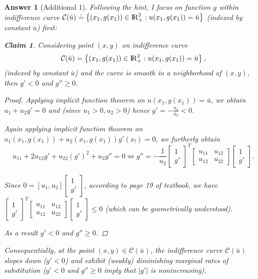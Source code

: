 \documentclass{article}
\newtheorem*{ans}{Answer}
\newtheorem{claim}{Claim}
\newcommand {\Reals}  {{\rm I \! R}}
\newcommand{\1}{{\bf 1}}
\newcommand{\cC}{\mathcal{C}}
\newcommand{\0}{{\mathbf{0}}}
\newcommand{\<}{\langle}
\renewcommand{\>}{\rangle}
\begin{document}
\begin{ans}[Additional 1]
	Following the hint, I focus on function $g$ within indifference curve $\cC(\bar u) \doteq \left\{(x_1, g(x_1)) \in \Reals_+^2: u(x_1, g(x_1)) = \bar u\right\}$ (indexed by constant $\bar u$) first:
\begin{mdframed}
		\begin{claim}
		Considering point $(x,y)$ on indifference curve 
		$$\cC(\bar u) = \left\{(x_1, g(x_1)) \in \Reals_+^2: u(x_1, g(x_1)) = \bar u\right\},$$ (indexed by constant $\bar u$) and the curve is smooth in a neighborhood of $(x,y)$, then
		$g'<0$ and $g''\ge 0$.
	\end{claim} 
\end{mdframed}
\begin{proof}
	Applying implicit function theorem on $u(x_1, g(x_1)) = \bar u$, we obtain $u_1 +u_2 g' = 0$ and (since $u_1>0,u_2 >0$) hence $g' =  - \frac{u_1}{u_2} <0$.
	
	Again applying implicit function theorem on $u_1 (x_1, g(x_1)) +u_2 (x_1, g(x_1))g'(x_!) = 0$, we furtherly obtain
	$$ u_{11} + 2u_{12} g' + u_{22} (g')^2 + u_2 g'' = 0 \Leftrightarrow  g'' = - \frac1{u_2}\begin{bmatrix} 1 \\ g'\end{bmatrix}^T \begin{bmatrix} u_{11} & u_{12} \\ u_{12} &  u_{22} \end{bmatrix} \begin{bmatrix} 1 \\ g'\end{bmatrix}.
	$$
	
	Since $ 0 = [u_1,u_2] \begin{bmatrix}1 \\ g' \end{bmatrix}$, according to page 19 of textbook, we have $\begin{bmatrix} 1 \\ g'\end{bmatrix}^T \begin{bmatrix} u_{11} & u_{12} \\ u_{12} &  u_{22} \end{bmatrix} \begin{bmatrix} 1 \\ g'\end{bmatrix} \le 0$ (which can be geometrically understood).
	
	As a result $g'<0$ and $g''\ge 0$.
\end{proof}

Consequentially, at the point $(x,y) \in \cC (\bar u)$, the indifference curve $\cC (\bar u)$ slopes down ($g'<0$) and exhibit (weakly) diminishing marginal rates of substitution ($g' <0$ and $g'' \ge 0$ imply that $|g'|$ is nonincreasing).
\end{ans}
\end{document}
